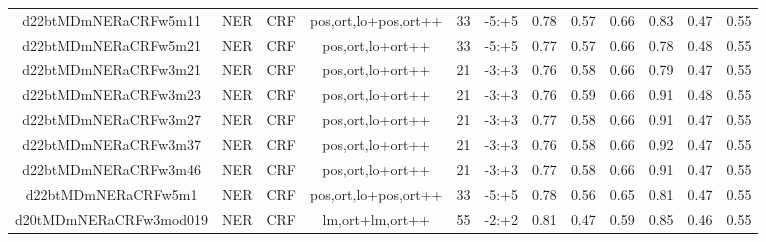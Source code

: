 \documentclass[a4paper]{article}
\begin{document}
\begin{landscape}
\begin{center}
\begin{tabular}{ |c|c|c|c|c|c|c|c|c|c|c|c|}
 
 	
 	\small{ d22btMDmNERaCRFw5m11 } & \small{ NER} & \small{  CRF }  & pos,ort,lo+pos,ort++  &  33 &  \small{  -5:+5 }  &  0.78 & 0.57 & 0.66  &  0.83 & 0.47 & 0.55 \\
 	

 
 	
 	\small{ d22btMDmNERaCRFw5m21 } & \small{ NER} & \small{  CRF }  & pos,ort,lo+ort++  &  33 &  \small{  -5:+5 }  &  0.77 & 0.57 & 0.66  &  0.78 & 0.48 & 0.55 \\
 	

 
 	
 	\small{ d22btMDmNERaCRFw3m21 } & \small{ NER} & \small{  CRF }  & pos,ort,lo+ort++  &  21 &  \small{  -3:+3 }  &  0.76 & 0.58 & 0.66  &  0.79 & 0.47 & 0.55 \\
 	

 
 	
 	\small{ d22btMDmNERaCRFw3m23 } & \small{ NER} & \small{  CRF }  & pos,ort,lo+ort++  &  21 &  \small{  -3:+3 }  &  0.76 & 0.59 & 0.66  &  0.91 & 0.48 & 0.55 \\
 	

 
 	
 	\small{ d22btMDmNERaCRFw3m27 } & \small{ NER} & \small{  CRF }  & pos,ort,lo+ort++  &  21 &  \small{  -3:+3 }  &  0.77 & 0.58 & 0.66  &  0.91 & 0.47 & 0.55 \\
 	

 
 	
 	\small{ d22btMDmNERaCRFw3m37 } & \small{ NER} & \small{  CRF }  & pos,ort,lo+ort++  &  21 &  \small{  -3:+3 }  &  0.76 & 0.58 & 0.66  &  0.92 & 0.47 & 0.55 \\
 	

 
 	
 	\small{ d22btMDmNERaCRFw3m46 } & \small{ NER} & \small{  CRF }  & pos,ort,lo+ort++  &  21 &  \small{  -3:+3 }  &  0.77 & 0.58 & 0.66  &  0.91 & 0.47 & 0.55 \\
 	

 
 	
 	\small{ d22btMDmNERaCRFw5m1 } & \small{ NER} & \small{  CRF }  & pos,ort,lo+pos,ort++  &  33 &  \small{  -5:+5 }  &  0.78 & 0.56 & 0.65  &  0.81 & 0.47 & 0.55 \\
 	

 
 	
 	\small{ d20tMDmNERaCRFw3mod019 } & \small{ NER} & \small{  CRF }  & lm,ort+lm,ort++  &  55 &  \small{  -2:+2 }  &  0.81 & 0.47 & 0.59  &  0.85 & 0.46 & 0.55 \\
 	


\end{tabular}
\end{center}
\end{landscape}
\end{document}
